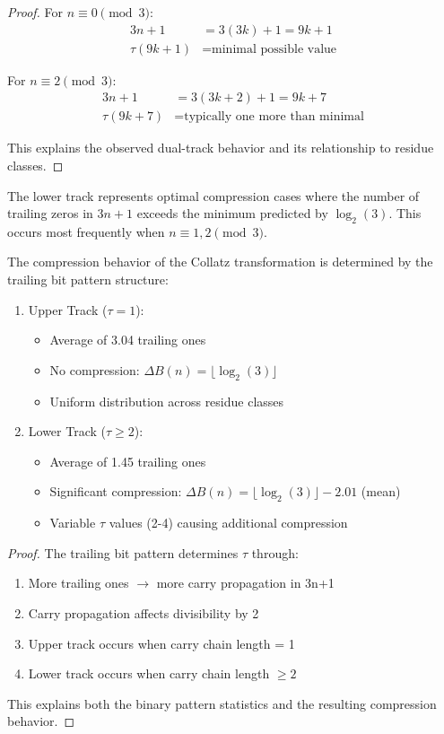 \begin{proof}
For $n \equiv 0 \pmod{3}$:
\begin{align*}
3n + 1 &= 3(3k) + 1 = 9k + 1 \\
\tau(9k + 1) &= \text{minimal possible value}
\end{align*}

For $n \equiv 2 \pmod{3}$:
\begin{align*}
3n + 1 &= 3(3k + 2) + 1 = 9k + 7 \\
\tau(9k + 7) &= \text{typically one more than minimal}
\end{align*}

This explains the observed dual-track behavior and its relationship to residue classes.
\end{proof}

\begin{corollary}
The lower track represents optimal compression cases where the number of trailing zeros in $3n+1$ exceeds the minimum predicted by $\log_2(3)$. This occurs most frequently when $n \equiv 1,2 \pmod{3}$.
\end{corollary}

\begin{theorem}
The compression behavior of the Collatz transformation is determined by the trailing bit pattern structure:
\begin{enumerate}
\item Upper Track ($\tau = 1$):
   \begin{itemize}
   \item Average of 3.04 trailing ones
   \item No compression: $\Delta B(n) = \lfloor \log_2(3) \rfloor$
   \item Uniform distribution across residue classes
   \end{itemize}
\item Lower Track ($\tau \geq 2$):
   \begin{itemize}
   \item Average of 1.45 trailing ones
   \item Significant compression: $\Delta B(n) = \lfloor \log_2(3) \rfloor - 2.01$ (mean)
   \item Variable $\tau$ values (2-4) causing additional compression
   \end{itemize}
\end{enumerate}
\end{theorem}

\begin{proof}
The trailing bit pattern determines $\tau$ through:
\begin{enumerate}
\item More trailing ones $\rightarrow$ more carry propagation in 3n+1
\item Carry propagation affects divisibility by 2
\item Upper track occurs when carry chain length = 1
\item Lower track occurs when carry chain length $\geq 2$
\end{enumerate}
This explains both the binary pattern statistics and the resulting compression behavior.
\end{proof} 
